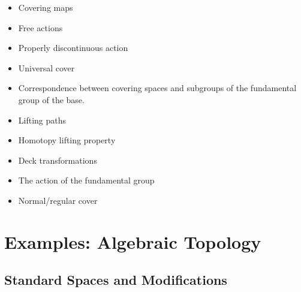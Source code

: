 \begin{itemize}
  \begin{itemize}
  \tightlist
  \item
    Covering maps
  \item
    Free actions
  \item
    Properly discontinuous action
  \item
    Universal cover
  \item
    Correspondence between covering spaces and subgroups of the
    fundamental group of the base.
  \item
    Lifting paths
  \item
    Homotopy lifting property
  \item
    Deck transformations
  \item
    The action of the fundamental group
  \item
    Normal/regular cover
  \end{itemize}
\end{itemize}

\hypertarget{examples-algebraic-topology}{%
\section{Examples: Algebraic
Topology}\label{examples-algebraic-topology}}

\hypertarget{standard-spaces-and-modifications}{%
\subsection{Standard Spaces and
Modifications}\label{standard-spaces-and-modifications}}

